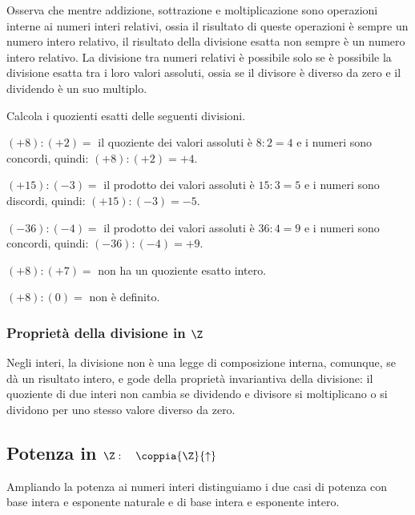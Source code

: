 Osserva che mentre addizione, sottrazione e moltiplicazione sono operazioni 
interne ai numeri interi relativi, ossia il risultato di queste operazioni 
è sempre un numero intero relativo, il risultato della divisione esatta non 
sempre è un numero intero relativo. 
La divisione tra numeri relativi è possibile solo se è possibile la divisione 
esatta tra i loro valori assoluti, ossia se
il divisore è diverso da zero e il dividendo è un suo multiplo.

\begin{esempio}{}{}
Calcola i quozienti esatti delle seguenti divisioni.
\begin{enumeratea}
\item \((+8) : (+2)=\) 
il quoziente dei valori assoluti è \(8 : 2 = 4\) 
e i numeri sono concordi, quindi: \((+8) : (+2) = +4\).
\item \((+15) : (-3) =\) 
il prodotto dei valori assoluti è \(15 : 3 = 5\) 
e i numeri sono discordi, quindi: \((+15) : (-3) = -5\).
\item \((-36) : (-4) =\) 
il prodotto dei valori assoluti è \(36 : 4 = 9\) 
e i numeri sono concordi, quindi: \((-36) : (-4) = +9\).
\item \((+8) : (+7) =\) non ha un quoziente esatto intero.
\item \((+8) : (0) =\) non è definito.
\end{enumeratea}
\end{esempio}

\subsubsection{Proprietà della divisione in $\Z$}

Negli interi, la divisione non è una legge di composizione interna, 
comunque, se dà un risultato intero, e gode della proprietà invariantiva 
della divisione: 
il quoziente di due interi non cambia se dividendo e divisore si 
moltiplicano o si dividono per uno stesso valore diverso da zero.



\subsection{Potenza in $\Z: \quad \coppia{\Z}{\uparrow}$}

Ampliando la potenza ai numeri interi distinguiamo i due casi di potenza con 
base intera e esponente naturale e di base intera e esponente intero. 

